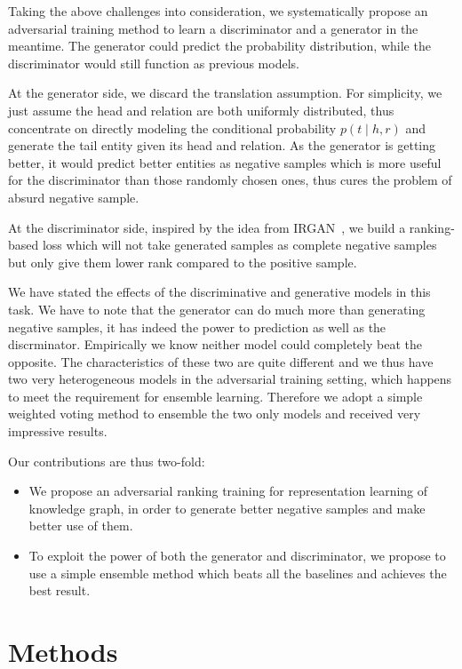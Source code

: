 \documentclass[twocolumn,a4paper,10pt,review,3p]{elsarticle}
\begin{document}
Taking the above challenges into consideration, we systematically propose an adversarial training method to learn a discriminator and a generator in the meantime. The generator could predict the probability distribution, while the discriminator would still function as previous models.

At the generator side, we discard the translation assumption. For simplicity, we just assume the head and relation are both uniformly distributed, thus concentrate on directly modeling the conditional probability $p(t\mid h, r)$ and generate the tail entity given its head and relation. As the generator is getting better, it would predict better entities as negative samples which is more useful for the discriminator than those randomly chosen ones, thus cures the problem of absurd negative sample.

At the discriminator side, inspired by the idea from IRGAN~\cite{IRGAN}, we build a ranking-based loss which will not take generated samples as complete negative samples but only give them lower rank compared to the positive sample.

We have stated the effects of the discriminative and generative models in this task. We have to note that the generator can do much more than generating negative samples, it has indeed the power to prediction as well as the discrminator. Empirically we know neither model could completely beat the opposite. The characteristics of these two are quite different and we thus have two very heterogeneous models in the adversarial training setting, which happens to meet the requirement for ensemble learning. Therefore we adopt a simple weighted voting method to ensemble the two only models and received very impressive results.

Our contributions are thus two-fold:
\begin{itemize}
    \item We propose an adversarial ranking training for representation learning of knowledge graph, in order to generate better negative samples and make better use of them.
    \item To exploit the power of both the generator and discriminator, we propose to use a simple ensemble method which beats all the baselines and achieves the best result.
\end{itemize}



\section{Methods}
\end{document}

